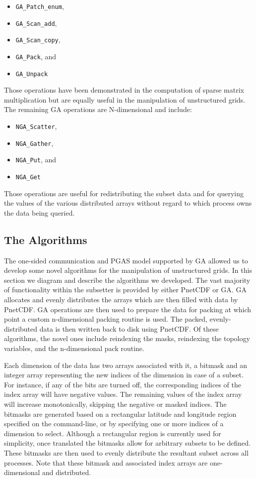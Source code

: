 \begin{itemize}
\item \verb=GA_Patch_enum=,
\item \verb=GA_Scan_add=,
\item \verb=GA_Scan_copy=,
\item \verb=GA_Pack=, and
\item \verb=GA_Unpack=
\end{itemize}

Those operations have been demonstrated in the computation of sparse matrix
multiplication\cite{GA} but are equally useful in the manipulation of
unstructured grids.  The remaining GA operations are N-dimensional and
include:

\begin{itemize}
\item \verb=NGA_Scatter=,
\item \verb=NGA_Gather=,
\item \verb=NGA_Put=, and
\item \verb=NGA_Get=
\end{itemize}

Those operations are useful for redistributing the subset data and for
querying the values of the various distributed arrays without regard to which
process owns the data being queried.

\subsection{The Algorithms}

The one-sided communication and PGAS model supported by GA allowed us to
develop some novel algorithms for the manipulation of unstructured grids.  In
this section we diagram and describe the algorithms we developed.  The vast
majority of functionality within the subsetter is provided by either PnetCDF
or GA.  GA allocates and evenly distributes the arrays which are then filled
with data by PnetCDF.  GA operations are then used to prepare the data for
packing at which point a custom n-dimensional packing routine is used.  The
packed, evenly-distributed data is then written back to disk using PnetCDF.
Of these algorithms, the novel ones include reindexing the masks, reindexing
the topology variables, and the n-dimensional pack routine.

Each dimension of the data has two arrays associated with it, a bitmask and an
integer array representing the new indices of the dimension in case of a
subset.  For instance, if any of the bits are turned off, the corresponding
indices of the index array will have negative values.  The remaining values of
the index array will increase monotonically, skipping the negative or masked
indices.  The bitmasks are generated based on a rectangular latitude and
longitude region specified on the command-line, or by specifying one or more
indices of a dimension to select.  Although a rectangular region is currently
used for simplicity, once translated the bitmasks allow for arbitrary subsets
to be defined.  These bitmasks are then used to evenly distribute the
resultant subset across all processes.  Note that these bitmask and associated
index arrays are one-dimensional and distributed.

